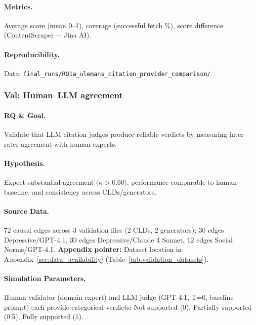 \paragraph{Metrics.}
Average score (mean 0--1), coverage (successful fetch \%), score difference (ContentScraper $-$ Jina AI).

\paragraph{Reproducibility.}
Data: \texttt{final\_runs/RQ1a\_ulemans\_citation\_provider\_comparison/}.

\subsubsection{Val: Human--LLM agreement}
\label{sec:human_llm_agreement}

\paragraph{RQ \& Goal.}
Validate that LLM citation judges produce reliable verdicts by measuring inter-rater agreement with human experts.

\paragraph{Hypothesis.}
Expect substantial agreement ($\kappa > 0.60$), performance comparable to human baseline, and consistency across CLDs/generators.

\paragraph{Source Data.}
72 causal edges across 3 validation files (2 CLDs, 2 generators): 30 edges Depressive/GPT-4.1, 30 edges Depressive/Claude 4 Sonnet, 12 edges Social Norms/GPT-4.1.
\textbf{Appendix pointer:} Dataset location in Appendix~\ref{sec:data_availability} (Table~\ref{tab:validation_datasets}).

\paragraph{Simulation Parameters.}
Human validator (domain expert) and LLM judge (GPT-4.1, T=0, baseline prompt) each provide categorical verdicts: Not supported (0), Partially supported (0.5), Fully supported (1).

